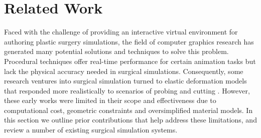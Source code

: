 \documentclass[12pt,oneside,letterpaper]{memoir}
\begin{document}


\chapter{Related Work}

Faced with the challenge of providing an interactive virtual
environment for authoring plastic surgery simulations, the field of
computer graphics research has generated many potential solutions and
techniques to solve this problem. Procedural techniques
\cite{JoshiMDGS:2007,WangP:2002,KavanCZO:2008} offer real-time
performance for certain animation tasks but lack the physical accuracy
needed in surgical simulations. Consequently, some research ventures
into surgical simulation turned to elastic deformation models
\cite{TerzoPBF:1987} that responded more realistically to scenarios of
probing and cutting \cite{BroC:1996,MendoL:2003,NienhS:2001}. However,
these early works were limited in their scope and effectiveness due to
computational cost, geometric constraints and oversimplified material
models. In this section we outline prior contributions that help
address these limitations, and review a number of existing surgical
simulation systems.
\end{document}

